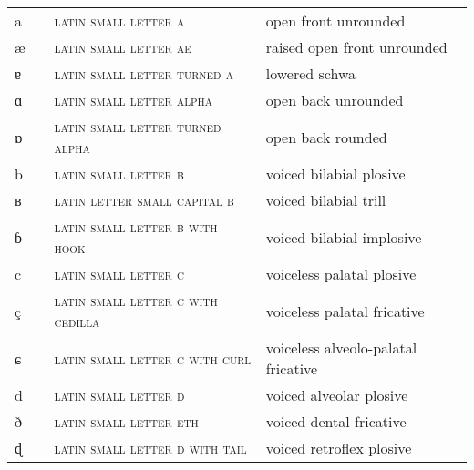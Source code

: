 \label{tab:ipa_letters}
 \tablelasttail{\bottomrule}
  
\begin{center}
\begin{xtabular}{ l L{1.1cm} L{5.4cm} L{4.2cm} }
a &  & \textsc{latin small letter a} & open front unrounded \\ 
æ &  & \textsc{latin small letter ae} & raised open front unrounded \\ 
ɐ &  & \textsc{latin small letter turned a} & lowered schwa \\ 
ɑ &  & \textsc{latin small letter alpha} & open back unrounded \\ 
ɒ &  & \textsc{latin small letter turned alpha} & open back rounded \\ 
b &  & \textsc{latin small letter b} & voiced bilabial plosive \\ 
ʙ &  & \textsc{latin letter small capital b} & voiced bilabial trill \\ 
ɓ &  & \textsc{latin small letter b with hook} & voiced bilabial implosive \\ 
c &  & \textsc{latin small letter c} & voiceless palatal plosive \\ 
ç &  & \textsc{latin small letter c with cedilla} & voiceless palatal fricative \\ 
ɕ &  & \textsc{latin small letter c with curl} & voiceless alveolo-palatal fricative \\ 
d &  & \textsc{latin small letter d} & voiced alveolar plosive \\ 
ð &  & \textsc{latin small letter eth} & voiced dental fricative \\ 
ɖ &  & \textsc{latin small letter d with tail} & voiced retroflex plosive \\ 

\end{xtabular}
\end{center}
